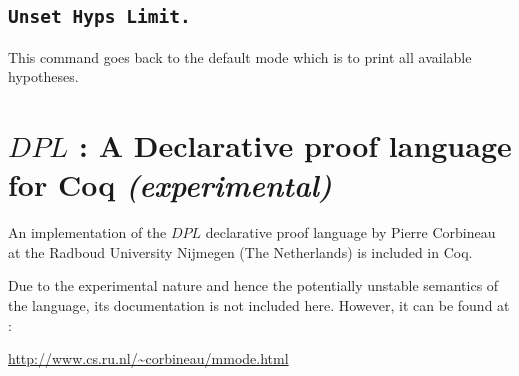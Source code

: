 \subsection[\tt Unset Hyps Limit.]{\tt Unset Hyps Limit.}
This command goes back to the default mode which is to print all
available hypotheses.




\section{$DPL$ : A Declarative proof language for Coq \emph{(experimental)} }

An implementation of the $DPL$ declarative proof language by Pierre Corbineau at the Radboud University Nijmegen (The Netherlands) is included in Coq.

 Due to the experimental nature and hence the potentially unstable semantics of the language, its documentation is not included here. However, it can be found at :

\url{http://www.cs.ru.nl/~corbineau/mmode.html}





